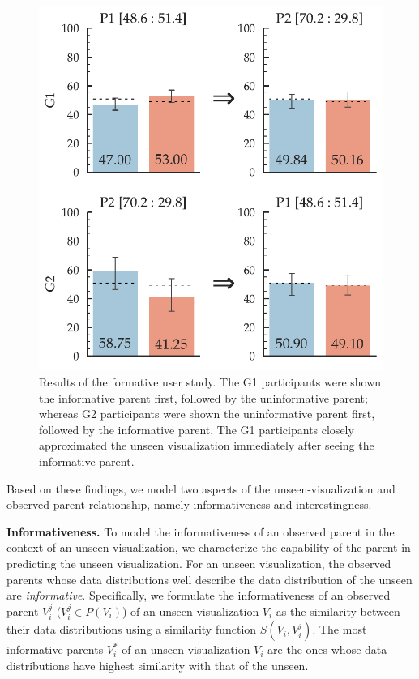 \begin{figure}[bht]
\label{example}
\centering
\includegraphics[scale=0.28]{figures/Formative_Study.pdf}
\caption{Results of the formative user study. The G1 participants were shown the informative parent first, followed by the uninformative parent; whereas G2 participants were shown the uninformative parent first, followed by the informative parent. The G1 participants closely approximated the unseen visualization immediately after seeing the informative parent.}
\end{figure}

Based on these findings, we model two aspects of the unseen-visualization and observed-parent relationship, namely informativeness and interestingness. 

\textbf{Informativeness.} To model the informativeness of an observed parent in the context of an unseen visualization, we characterize the capability of the parent in predicting the unseen visualization. For an unseen visualization, the observed parents whose data distributions well describe the data distribution of the unseen are \emph{informative}. Specifically, we formulate the informativeness of an observed parent $V_i^j$ ($V_i^j \in P(V_i)$) of an unseen visualization $V_i$ as the similarity between their data distributions using a similarity function $S(V_i, V_i^j)$. The most informative parents $V_i^*$ of an unseen visualization $V_i$ are the ones whose data distributions have highest similarity with that of the unseen.

